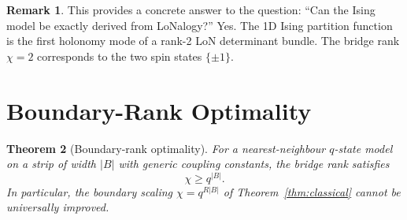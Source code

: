 \documentclass[12pt]{article}
\theoremstyle{plain}
\newtheorem{theorem}{Theorem}[section]
\theoremstyle{definition}
\newtheorem{remark}[theorem]{Remark}
\numberwithin{equation}{section}
\begin{document}
\begin{remark}
This provides a concrete answer to the question: ``Can the Ising model
be exactly derived from LoNalogy?''  Yes.  The 1D Ising partition
function is the first holonomy mode of a rank-2 LoN determinant bundle.
The bridge rank $\chi=2$ corresponds to the two spin states $\{\pm 1\}$.
\end{remark}


\section{Boundary-Rank Optimality}\label{sec:optimality}

\begin{theorem}[Boundary-rank optimality]\label{thm:optimality}
For a nearest-neighbour $q$-state model on a strip of width $|B|$
with generic coupling constants, the bridge rank satisfies
\begin{equation}
\boxed{\chi \geq q^{|B|}.}
\end{equation}
In particular, the boundary scaling $\chi=q^{R|B|}$ of
Theorem~\ref{thm:classical} cannot be universally improved.
\end{theorem}
\end{document}
